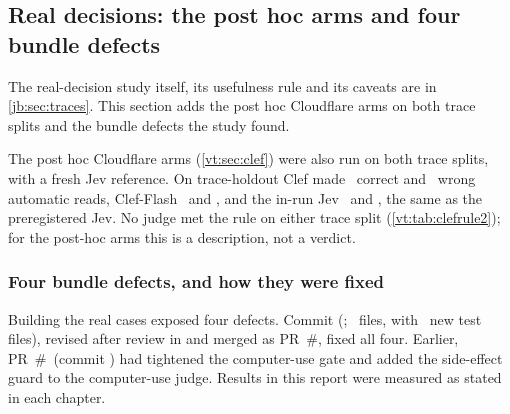 \subsection{Real decisions: the post hoc arms and four bundle defects}\label{vt:sec:traces}

The real-decision study itself, its usefulness rule and its caveats are in \cref{jb:sec:traces}. This section adds the
post hoc Cloudflare arms on both trace splits and the bundle defects the study found.

The post hoc Cloudflare arms (\cref{vt:sec:clef}) were also run on both trace splits, with a fresh Jev reference. On
trace-holdout Clef made \ClTrHoldClefReads\ correct and \ClTrHoldClefReadWa\ wrong automatic reads, Clef-Flash
\ClTrHoldFlashReads\ and \ClTrHoldFlashReadWa, and the in-run Jev \ClTrHoldJevReads\ and \ClTrHoldJevReadWa, the same as
the preregistered Jev. No judge met the rule on either trace split (\cref{vt:tab:clefrule2}); for the post-hoc arms this is
a description, not a verdict.

\begin{table}[tbp]
\centering\small
\caption{Rule 2 (``useful'' read shortcut) on both trace splits for the post-hoc run: correct automatic reads among
the read-labelled cases, wrong automatic reads among all cases, and the 95\,\% Wilson upper bound of the wrong-read
rate (the rule needs at least \TrUsefulMinReads\ correct reads and an upper bound below \TrUsefulMaxUpperPct\,\%).}
\label{vt:tab:clefrule2}

\end{table}





\subsubsection{Four bundle defects, and how they were fixed}\label{vt:sec:since}\label{sec:since}

Building the real cases exposed four defects. Commit \code{\PRFixSha} (\PRFixDate; \PRFixFiles\ files, with
\PRFixTests\ new test files), revised after review in \code{\PRFixReviewSha} and merged as PR~\#\PRFixNumber,
fixed all four. Earlier, PR~\#\SincePR\ (commit \code{\SinceCommit}) had tightened the computer-use gate and added
the side-effect guard to the computer-use judge. Results in this report were measured as stated in each chapter.

